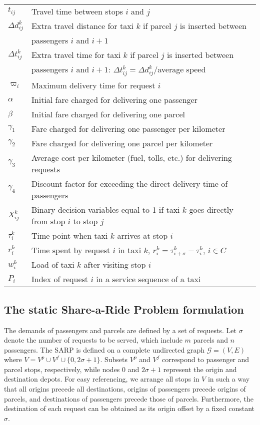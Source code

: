 \documentclass[preprint,authoryear,12pt]{elsarticle}
\begin{document}
\begin{table*}
\begin{tabular}{ll}
$t_{ij}$& Travel time between stops $i$ and $j$\\
$\Delta d_{ij}^{k}$ & Extra travel distance for taxi $k$ if parcel $j$ is inserted between \\
& passengers $i$ and $i+1$\\
$\Delta t_{ij}^{k}$ & Extra travel time for taxi $k$ if parcel $j$ is inserted between \\
&passengers $i$ and $i+1$: $\Delta t_{ij}^{k}=\Delta d_{ij}^{k}$/average speed\\
$\varpi_i$ & Maximum delivery time for request $i$\\
$\alpha$ & Initial fare charged for delivering one passenger\\
$\beta$  & Initial fare charged for delivering one parcel\\
$\gamma_1$ & Fare charged for delivering one passenger per kilometer\\
$\gamma_2$ & Fare charged for delivering one parcel per kilometer\\
$\gamma_3$ & Average cost per kilometer (fuel, tolls, etc.) for delivering requests\\
$\gamma_4$ & Discount factor for exceeding the direct delivery time of passengers\\
\hline
$X_{ij}^{k}$ & Binary decision variables equal to 1 if taxi $k$ goes
directly from stop $i$ to stop $j$\\
$\tau_i^k$& Time point when taxi $k$ arrives at stop $i$\\
$r_i^k$& Time spent by request $i$ in taxi $k$, $r_i^k=\tau_{i+\sigma}^k-\tau_{i}^k$, $i\in C$\\
$w_i^k$& Load of taxi $k$ after visiting stop $i$\\
$P_i$ & Index of request $i$ in a service sequence of a taxi\\
\hline
\end{tabular}
\label{notation}
\end{table*}



\subsection{The static Share-a-Ride Problem formulation}
\label{ssarp_model}
The demands of passengers and parcels are defined by a set of requests. Let $\sigma$ denote the number of requests to be served, which include $m$ parcels and $n$ passengers. The SARP is defined on a complete undirected graph $\mathcal{G} = (V,E)$ where $V = V^p\cup V^f \cup \{0,2\sigma+1\}$. Subsets $V^p$ and $V^f$ correspond to passenger and parcel stops, respectively, while nodes $0$ and $2\sigma + 1$ represent the origin and destination depots. For easy referencing, we arrange all stops in $V$ in such a way that all origins precede all destinations, origins of passengers precede origins of parcels, and destinations of passengers precede those of parcels. Furthermore, the destination of each request can be obtained as its origin offset by a fixed constant $\sigma$.
\end{document}
